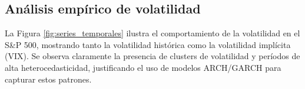 \subsection{Análisis empírico de volatilidad}

La Figura \ref{fig:series_temporales} ilustra el comportamiento de la volatilidad en el S\&P 500, mostrando tanto la volatilidad histórica como la volatilidad implícita (VIX). Se observa claramente la presencia de clusters de volatilidad y períodos de alta heterocedasticidad, justificando el uso de modelos ARCH/GARCH para capturar estos patrones.

